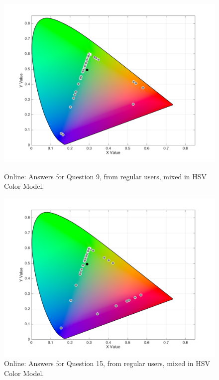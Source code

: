 \begin{figure}[htbp]
  \centering
  \vspace{-15pt}
  \begin{minipage}{0.48\textwidth}
    \centering
    \includegraphics[width=\textwidth]{images/results/9_online_HSVresponses.png}
    \caption[Online: Answers for Question 9, from regular users, mixed in HSV Color Model.]{Online: Answers for Question 9, from regular users, mixed in HSV Color Model.}
    \label{fig:onlinehsvregular_9}
  \end{minipage}\hfill
  \begin{minipage}{0.48\textwidth}
    \centering
    \includegraphics[width=\textwidth]{images/results/15_online_HSVresponses.png}
    \caption[Online: Answers for Question 15, from regular users, mixed in HSV Color Model.]{Online: Answers for Question 15, from regular users, mixed in HSV Color Model.}
    \label{fig:onlinehsvregular_15}
  \end{minipage}
  \vspace{-5pt}
\end{figure}
%
